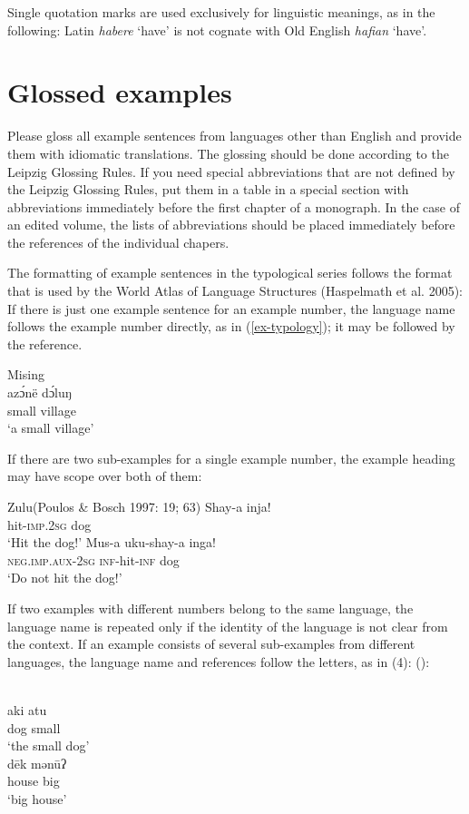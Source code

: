 Single quotation marks are used exclusively for linguistic meanings, as in the following:
\ea
Latin \textit{habere} `have' is not cognate with Old English \textit{hafian} `have'.
\z

\section{Glossed examples}

Please gloss all example sentences from languages other than English and provide them with idiomatic translations. The glossing should be done according
to the Leipzig Glossing Rules. 
If you need special abbreviations that are not defined by the Leipzig Glossing Rules, put them in a table in a special section with abbreviations immediately before the first chapter of a monograph. In the case of an edited volume, the lists of abbreviations should be placed immediately before the references of the individual chapers.

The formatting of example sentences in the typological series follows the format that is used by the World Atlas of Language Structures (Haspelmath et al. 2005): If there is just one example sentence for an example number, the language name follows the example number directly, as in (\ref{ex-typology}); it may be followed by the reference.

{\def\exfont{\normalsize\itshape}
\ea\label{ex-typology}
{\rm Mising \citep[69]{Prasad91a}}\\
\gll azɔ́në dɔ́luŋ\\
     small village\\ 
\glt `a small village' 
\z


If there are two sub-examples for a single example number, the example heading may have scope over both of them:

\ea
{\rm Zulu}{(Poulos \& Bosch 1997: 19; 63)}
\ea
\gll Shay-a		inja!\\
hit-\textsc{imp.2sg}	dog\\
\glt `Hit the dog!'
\ex
\gll	Mus-a	uku-shay-a	inga! \\
	\textsc{neg.imp.aux-2sg}	\textsc{inf}-hit-\textsc{inf}	dog \\
\glt		`Do not hit the dog!'	
\z
\z

If two examples with different numbers belong to the same language, the language name is repeated only if the identity of the language is not clear from the context. If an example consists of several sub-examples from different languages, the language name and references follow the letters, as in (4):
():

\ea
{}\\
\gll aki atu\\ 
     dog small\\ 
\glt ‘the small dog’ 
\\ 
\gll dēk mənūʔ\\
     house big\\
\glt ‘big house’ 
\z
}

